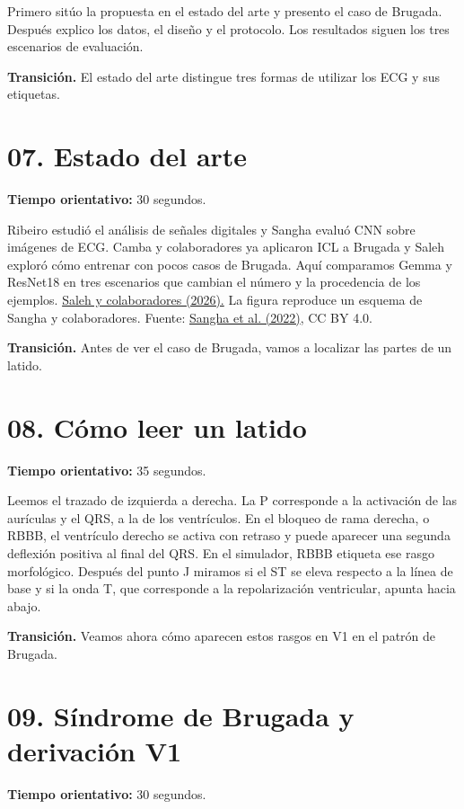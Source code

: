 \documentclass[11pt,a4paper]{article}
\begin{document}
Primero sitúo la propuesta en el estado del arte y presento el caso de Brugada. Después explico los datos, el diseño y el protocolo. Los resultados siguen los tres escenarios de evaluación.

\textbf{Transición.} El estado del arte distingue tres formas de utilizar los ECG y sus etiquetas.

\section*{07. Estado del arte}
\textbf{Tiempo orientativo: }30 segundos.

Ribeiro estudió el análisis de señales digitales y Sangha evaluó CNN sobre imágenes de ECG. Camba y colaboradores ya aplicaron ICL a Brugada y Saleh exploró cómo entrenar con pocos casos de Brugada. Aquí comparamos Gemma y ResNet18 en tres escenarios que cambian el número y la procedencia de los ejemplos. \href{https://doi.org/10.1371/journal.pdig.0001222}{Saleh y colaboradores (2026).} La figura reproduce un esquema de Sangha y colaboradores. Fuente: \href{https://pmc.ncbi.nlm.nih.gov/articles/PMC8948243/}{Sangha et al. (2022)}, CC BY 4.0.

\textbf{Transición.} Antes de ver el caso de Brugada, vamos a localizar las partes de un latido.

\section*{08. Cómo leer un latido}
\textbf{Tiempo orientativo: }35 segundos.

Leemos el trazado de izquierda a derecha. La P corresponde a la activación de las aurículas y el QRS, a la de los ventrículos. En el bloqueo de rama derecha, o RBBB, el ventrículo derecho se activa con retraso y puede aparecer una segunda deflexión positiva al final del QRS. En el simulador, RBBB etiqueta ese rasgo morfológico. Después del punto J miramos si el ST se eleva respecto a la línea de base y si la onda T, que corresponde a la repolarización ventricular, apunta hacia abajo.

\textbf{Transición.} Veamos ahora cómo aparecen estos rasgos en V1 en el patrón de Brugada.

\section*{09. Síndrome de Brugada y derivación V1}
\textbf{Tiempo orientativo: }30 segundos.
\end{document}
